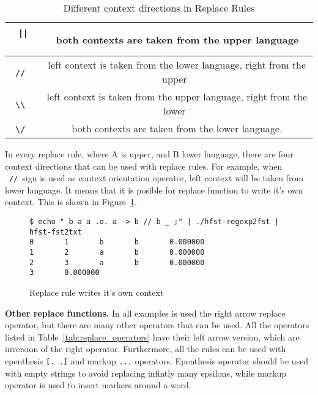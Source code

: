 \documentclass{llncs}
\begin{document}
\begin{table} [h!]
\centering
\begin{tabular}{ | c | c | }
\hline
\ \verb!||!\ & \ both contexts are taken from the upper language \\ \hline
\ \verb!//!\ & \ left context is taken from the lower language, right from the upper \\ \hline
\ \verb!\\!\ & \ left context is taken from the upper language, right from the lower \\ \hline
\ \verb!\/!\ & \ both contexts are taken from the lower language. \\ \hline
\end{tabular}
\caption{Different context directions in Replace Rules}
\label{tab:context_directions}
\end{table}

In every replace rule, where A is upper, and B lower language, there are four context directions that can be used with replace rules. For example, when \ \verb!//!\ sign is used as context orientation operator, left context will be taken from lower language. It means that it is posible for replace function to write it's own context. This is shown in Figure~\ref{fig:context_orientation}. 

\begin{figure} [h!]
 \begin{verbatim}
$ echo " b a a .o. a -> b // b _ ;" | ./hfst-regexp2fst | hfst-fst2txt
0       1       b       b       0.000000
1       2       a       b       0.000000
2       3       a       b       0.000000
3       0.000000
\end{verbatim}
\caption{Replace rule writes it's own context}
\label{fig:context_orientation}
\end{figure}





\textbf{Other replace functions.} In all examples is used the right arrow replace operator, but there are many other operators that can be used. All the operators listed in Table~\ref{tab:replace_operators} have their left arrow version, which are inversion of the right operator. Furthermore, all the rules can be used with epenthesis \verb![. .]! and markup \verb!...! operators. Epenthesis operator should be used with empty strings to avoid replacing infintly many epsilons, while markup operator is used to insert markers around a word.
\end{document}
